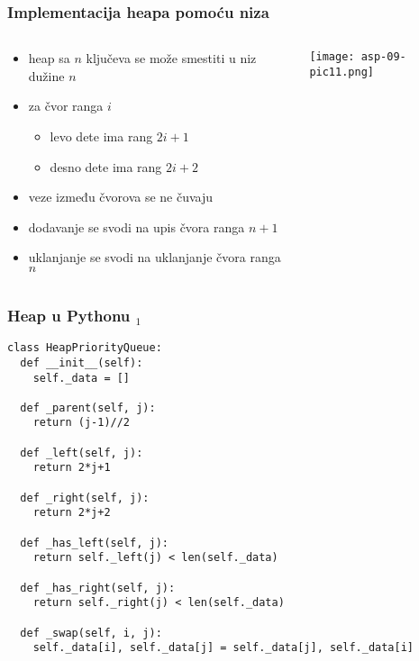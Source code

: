 \documentclass[compress]{beamer}
\begin{document}
\begin{frame}[fragile]
  \frametitle{Implementacija heapa pomoću niza}
  \begin{columns}
    \begin{column}[c]{6cm}
      \begin{itemize}
        \item heap sa $n$ ključeva se može smestiti u niz dužine $n$
        \item za čvor ranga $i$
        \begin{itemize}
          \item levo dete ima rang $2i+1$
          \item desno dete ima rang $2i+2$
        \end{itemize}
        \item veze između čvorova se ne čuvaju
        \item dodavanje se svodi na upis čvora ranga $n+1$
        \item uklanjanje se svodi na uklanjanje čvora ranga $n$
      \end{itemize}
    \end{column}
    \begin{column}[c]{5cm}
      \begin{center}
        \texttt{[image: asp-09-pic11.png]}
      \end{center}
    \end{column}
  \end{columns}
\end{frame}

\begin{frame}
  \frametitle{Heap u Pythonu $_1$}
\begin{verbatim}
class HeapPriorityQueue:
  def __init__(self):
    self._data = []
  
  def _parent(self, j):
    return (j-1)//2
    
  def _left(self, j):
    return 2*j+1
  
  def _right(self, j):
    return 2*j+2
    
  def _has_left(self, j):
    return self._left(j) < len(self._data)
    
  def _has_right(self, j):
    return self._right(j) < len(self._data)
    
  def _swap(self, i, j):
    self._data[i], self._data[j] = self._data[j], self._data[i]
\end{verbatim}
\end{frame}
\end{document}

